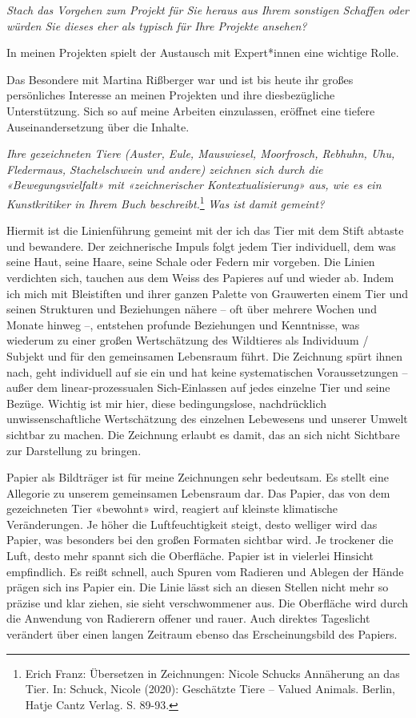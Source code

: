\documentclass[a4paper,
fontsize=11pt,
oneside,
numbers=noperiodatend,
parskip=half-,
bibliography=totoc,
final
]{scrartcl}
\begin{document}
\emph{Stach das Vorgehen zum Projekt für Sie heraus aus Ihrem sonstigen
Schaffen oder würden Sie dieses eher als typisch für Ihre Projekte
ansehen?}

In meinen Projekten spielt der Austausch mit Expert*innen eine wichtige
Rolle.

Das Besondere mit Martina Rißberger war und ist bis heute ihr großes
persönliches Interesse an meinen Projekten und ihre diesbezügliche
Unterstützung. Sich so auf meine Arbeiten einzulassen, eröffnet eine
tiefere Auseinandersetzung über die Inhalte.

\emph{Ihre gezeichneten Tiere (Auster, Eule, Mauswiesel, Moorfrosch,
Rebhuhn, Uhu, Fledermaus, Stachelschwein und andere) zeichnen sich durch
die «Bewegungsvielfalt» mit «zeichnerischer Kontextualisierung» aus, wie
es ein Kunstkritiker in Ihrem Buch beschreibt.}\footnote{Erich Franz:
  Übersetzen in Zeichnungen: Nicole Schucks Annäherung an das Tier. In:
  Schuck, Nicole (2020): Geschätzte Tiere -- Valued Animals. Berlin,
  Hatje Cantz Verlag. S. 89-93.} \emph{Was ist damit gemeint?}

Hiermit ist die Linienführung gemeint mit der ich das Tier mit dem Stift
abtaste und bewandere. Der zeichnerische Impuls folgt jedem Tier
individuell, dem was seine Haut, seine Haare, seine Schale oder Federn
mir vorgeben. Die Linien verdichten sich, tauchen aus dem Weiss des
Papieres auf und wieder ab. Indem ich mich mit Bleistiften und ihrer
ganzen Palette von Grauwerten einem Tier und seinen Strukturen und
Beziehungen nähere -- oft über mehrere Wochen und Monate hinweg --,
entstehen profunde Beziehungen und Kenntnisse, was wiederum zu einer
großen Wertschätzung des Wildtieres als Individuum / Subjekt und für den
gemeinsamen Lebensraum führt. Die Zeichnung spürt ihnen nach, geht
individuell auf sie ein und hat keine systematischen Voraussetzungen --
außer dem linear-prozessualen Sich-Einlassen auf jedes einzelne Tier und
seine Bezüge. Wichtig ist mir hier, diese bedingungslose, nachdrücklich
unwissenschaftliche Wertschätzung des einzelnen Lebewesens und unserer
Umwelt sichtbar zu machen. Die Zeichnung erlaubt es damit, das an sich
nicht Sichtbare zur Darstellung zu bringen.

Papier als Bildträger ist für meine Zeichnungen sehr bedeutsam. Es
stellt eine Allegorie zu unserem gemeinsamen Lebensraum dar. Das Papier,
das von dem gezeichneten Tier «bewohnt» wird, reagiert auf kleinste
klimatische Veränderungen. Je höher die Luftfeuchtigkeit steigt, desto
welliger wird das Papier, was besonders bei den großen Formaten sichtbar
wird. Je trockener die Luft, desto mehr spannt sich die Oberfläche.
Papier ist in vielerlei Hinsicht empfindlich. Es reißt schnell, auch
Spuren vom Radieren und Ablegen der Hände prägen sich ins Papier ein.
Die Linie lässt sich an diesen Stellen nicht mehr so präzise und klar
ziehen, sie sieht verschwommener aus. Die Oberfläche wird durch die
Anwendung von Radierern offener und rauer. Auch direktes Tageslicht
verändert über einen langen Zeitraum ebenso das Erscheinungsbild des
Papiers.
\end{document}
